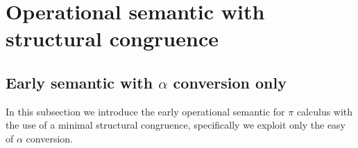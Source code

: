 




\section{Operational semantic with structural congruence}

\subsection{Early semantic with $\alpha$ conversion only}
In this subsection we introduce the early operational semantic for $\pi$ calculus with the use of a minimal structural congruence, specifically we exploit only the easy of $\alpha$ conversion.

